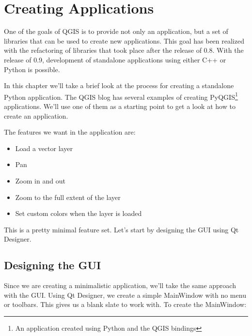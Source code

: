 \section{Creating Applications}

One of the goals of QGIS is to provide not only an application, but a set of
libraries that can be used to create new applications. This goal has been
realized with the refactoring of libraries that took place after the release of
0.8. With the release of 0.9, development of standalone
applications using either C++ or Python is possible.

In this chapter we'll take a brief look at the process for creating a standalone
Python application. The QGIS blog has several examples of creating
PyQGIS\footnote{An application created using Python and the QGIS bindings}
applications. We'll use one of them as a starting point to get a look at how to
create an application.

The features we want in the application are:

\begin{itemize}
\item Load a vector layer
\item Pan
\item Zoom in and out
\item Zoom to the full extent of the layer
\item Set custom colors when the layer is loaded
\end{itemize} 

This is a pretty minimal feature set. Let's start by designing the GUI using
Qt Designer. 

\subsection{Designing the GUI}

Since we are creating a minimalistic application, we'll take the same
approach with the GUI. Using Qt Designer, we create a simple MainWindow with
no menu or toolbars. This gives us a blank slate to work with. To create the
MainWindow:

